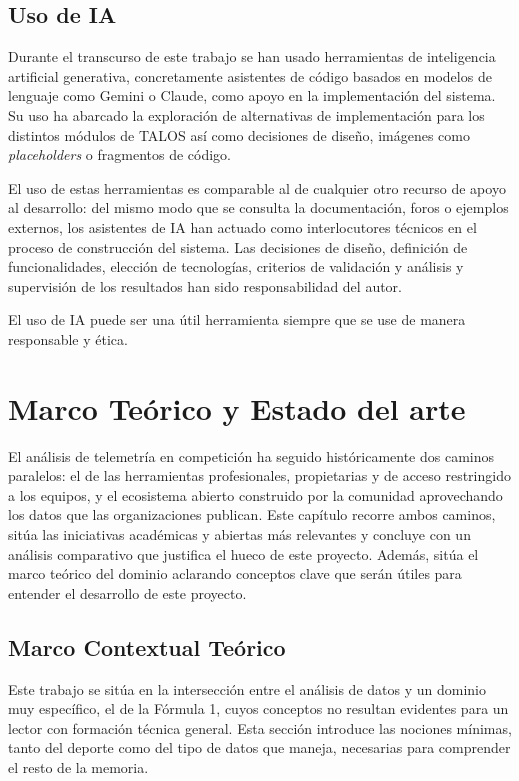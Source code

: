 \documentclass[12pt,a4paper,twoside,openright]{book}
\begin{document}
\section{Uso de IA}
Durante el transcurso de este trabajo se han usado herramientas de inteligencia artificial generativa, concretamente asistentes de código basados en modelos de lenguaje como Gemini o Claude, como apoyo en la implementación del sistema.
Su uso ha abarcado la exploración de alternativas de implementación para los distintos módulos de TALOS así como decisiones de diseño, imágenes como \textit{placeholders} o fragmentos de código.

\noindent El uso de estas herramientas es comparable al de cualquier otro recurso de apoyo al desarrollo: del mismo modo que se consulta la documentación, foros o ejemplos externos, los asistentes de IA han actuado como interlocutores técnicos en el proceso de construcción del sistema.
Las decisiones de diseño, definición de funcionalidades, elección de tecnologías, criterios de validación y análisis y supervisión de los resultados han sido responsabilidad del autor.

\noindent El uso de IA puede ser una útil herramienta siempre que se use de manera responsable y ética.

\chapter{Marco Teórico y Estado del arte}
El análisis de telemetría en competición ha seguido históricamente dos caminos paralelos: el de las herramientas profesionales, propietarias y de acceso restringido a los equipos, y el ecosistema abierto construido por la comunidad
aprovechando los datos que las organizaciones publican. Este capítulo recorre ambos caminos, sitúa las iniciativas académicas y abiertas más relevantes y concluye con un análisis comparativo que justifica el hueco de este proyecto. Además, sitúa el marco teórico del dominio aclarando conceptos clave que serán útiles para entender el desarrollo de este proyecto.

\section{Marco Contextual Teórico}
Este trabajo se sitúa en la intersección entre el análisis de datos y un dominio muy específico, el de la Fórmula 1, cuyos conceptos no resultan evidentes para un lector con formación técnica general. Esta sección introduce las nociones mínimas, tanto del deporte como del tipo de datos que maneja, necesarias para comprender el resto de la memoria.
\end{document}
